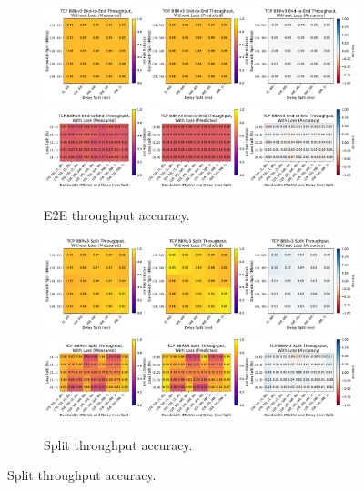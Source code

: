 \begin{figure}[t]
    \centering
    \begin{subfigure}[b]{0.325\linewidth}
        \centering
        \includegraphics[width=\linewidth,trim={0 0 25.8cm 0},clip]
         {splitting/figures/accuracy_e2e_without_loss.pdf}
        \includegraphics[width=\linewidth,trim={0 0 25.8cm 0},clip]
         {splitting/figures/accuracy_e2e_with_loss.pdf}
        \captionsetup{skip=4pt}
        \caption{E2E throughput accuracy.}
        \label{fig:splitting:accuracy:e2e}
    \end{subfigure}
    \begin{subfigure}[b]{0.645\linewidth}
        \centering
        \includegraphics[width=\linewidth,trim={0 0 13.4cm 0},clip]
         {splitting/figures/accuracy_split_without_loss.pdf}
        \includegraphics[width=\linewidth,trim={0 0 13.4cm 0},clip]
         {splitting/figures/accuracy_split_with_loss.pdf}
        \captionsetup{skip=4pt}
        \caption{Split throughput accuracy.}
        \label{fig:splitting:accuracy:split}
    \end{subfigure}


\end{figure}
